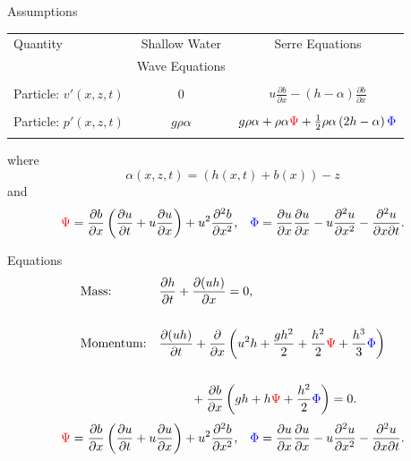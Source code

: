 \documentclass[]{beamer}
\begin{document}
\begin{frame}{Assumptions}
	\bigbreak
	 \pause 
	 \begin{tabular}{l | c | c}
	 	Quantity& Shallow Water & Serre Equations\\
	 	& Wave Equations &\\
	 	\hline && \\
	 	Particle: $v'(x,z,t)$& $0$ & $u\frac{\partial b}{\partial x} - (h - \alpha)\frac{\partial b}{\partial x}$ \\ & & \\ \pause
	 	Particle: $p'(x,z,t)$& $g \rho \alpha$ & $g \rho \alpha + \rho \alpha{ \color{red}\Psi } + \frac{1}{2} \rho \alpha \left(2h - \alpha\right) { \color{blue} \Phi }$ \\ & & \\ \hline
	 \end{tabular}
	 \bigbreak
	  where $$\alpha(x,z,t) = (h(x,t) + b(x)) - z$$ \pause
	 \bigskip
	  and
		\begin{align*}
		&{ \color{red}\Psi }  = \dfrac{\partial b}{\partial x}\left(\dfrac{\partial u}{\partial t} + u\dfrac{\partial u}{\partial x} \right)  + u^2\dfrac{\partial^2 b}{\partial x^2}, &
		{ \color{blue} \Phi }  = \dfrac{\partial u }{\partial x} \dfrac{\partial u}{\partial x} -u \dfrac{\partial^2 u}{\partial x^2}  - \dfrac{\partial^2 u}{\partial x \partial t} .
		\end{align*}
\end{frame}
\begin{frame}{Equations}
	\begin{subequations}
		\begin{align*}
		&\text{Mass:} && \frac{\partial h}{\partial t} + \dfrac{\partial (uh)}{\partial x} = 0,  \\ \\
		&\text{Momentum:} &&\dfrac{\partial (uh)}{\partial t} + \dfrac{\partial}{\partial x} \left ( u^2h + \dfrac{gh^2}{2} + \dfrac{h^2}{2}{ \color{red}\Psi } + \dfrac{h^3}{3}{ { \color{blue} \Phi } }  \right )   \\ \\& &&\quad \quad \; \; +  \dfrac{\partial b}{\partial x} \left (gh +   h { \color{red}\Psi } + \dfrac{h^2}{2}{ { \color{blue} \Phi } }  \right ) = 0.
		\end{align*}
	\end{subequations}
		\begin{align*}
		&{ \color{red}\Psi }  = \dfrac{\partial b}{\partial x}\left(\dfrac{\partial u}{\partial t} + u\dfrac{\partial u}{\partial x} \right)  + u^2\dfrac{\partial^2 b}{\partial x^2}, &
		{ \color{blue} \Phi }  = \dfrac{\partial u }{\partial x} \dfrac{\partial u}{\partial x} -u \dfrac{\partial^2 u}{\partial x^2}  - \dfrac{\partial^2 u}{\partial x \partial t} .
		\end{align*}
\end{frame}
\end{document}
